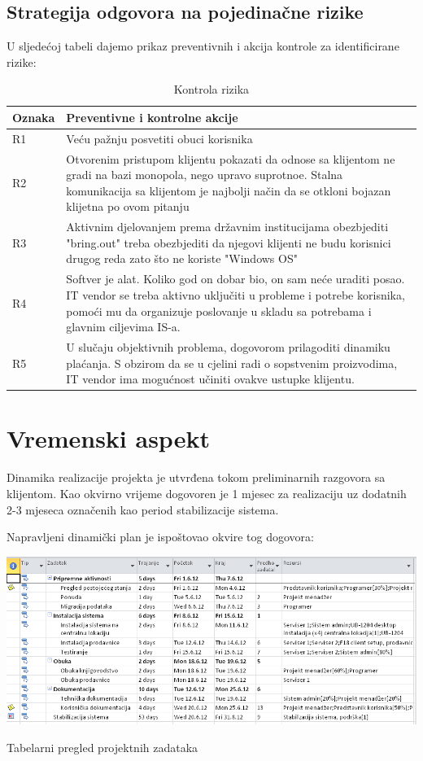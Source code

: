 \documentclass[times, utf8, seminar]{fit}
\begin{document}
\subsection{Strategija odgovora na pojedinačne rizike} 

U sljedećoj tabeli dajemo prikaz preventivnih i akcija kontrole za identificirane rizike:

\begin{table}[!h]
\centering
\begin{tabular}{|p{1.7cm}|p{13.2cm}|}
\hline
Oznaka & Preventivne i kontrolne akcije  \\ \hline\hline
R1 & Veću pažnju posvetiti obuci korisnika \\ \hline
R2 & Otvorenim pristupom klijentu pokazati da odnose sa klijentom ne gradi na bazi monopola, nego upravo suprotnoe. Stalna komunikacija sa klijentom je najbolji način da se otkloni bojazan klijetna po ovom pitanju\\ \hline
R3 & Aktivnim djelovanjem prema državnim institucijama obezbjediti "bring.out" treba obezbjediti da njegovi klijenti ne budu korisnici drugog reda zato što ne koriste "Windows OS"\\ \hline 
R4 & Softver je alat. Koliko god on dobar bio, on sam neće uraditi posao. IT vendor se treba aktivno uključiti u probleme i potrebe korisnika, pomoći mu da organizuje poslovanje u skladu sa potrebama i glavnim ciljevima IS-a.\\ \hline
R5 & U slučaju objektivnih problema, dogovorom prilagoditi dinamiku plaćanja. S obzirom da se u cjelini radi o sopstvenim proizvodima, IT vendor ima mogućnost učiniti ovakve ustupke klijentu. \\ \hline
\end{tabular}
\caption{Kontrola rizika}
\end{table}

\pagebreak
\section{Vremenski aspekt}

Dinamika realizacije projekta je utvrđena tokom preliminarnih razgovora sa klijentom. Kao okvirno vrijeme dogovoren je 1 mjesec za realizaciju uz dodatnih 2-3 mjeseca označenih kao period stabilizacije sistema. 

Napravljeni dinamički plan je ispoštovao okvire tog dogovora:

\begin{table}[!h]
\centering
\includegraphics[width=15.5cm]{img/dinamika_sheet.png}
\caption{Tabelarni pregled projektnih zadataka}
\end{table}
\end{document}

